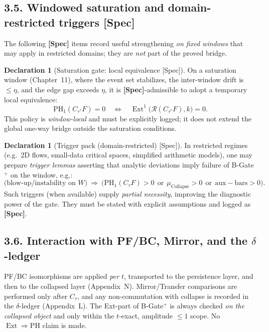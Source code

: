 \documentclass[11pt]{article}
\DeclareMathOperator{\Ext}{Ext}
\numberwithin{equation}{section}
\theoremstyle{definition}
\newtheorem{declaration}[theorem]{Declaration}
\begin{document}
\subsection*{3.5. Windowed saturation and domain-restricted triggers \textup{[Spec]}}
The following \textbf{[Spec]} items record useful strengthening \emph{on fixed windows} that may apply in restricted domains; they are \emph{not} part of the proved bridge.

\begin{declaration}[Saturation gate: local equivalence \textup{[Spec]}]\label{dec:saturation-local}
On a saturation window (Chapter~11), where the event set stabilizes, the inter-window drift is $\le\eta$, and the edge gap exceeds $\eta$, it is \textbf{[Spec]}-admissible to adopt a temporary local equivalence:
\[
\mathrm{PH}_1(C_{\tau^\ast}F)=0\quad\Longleftrightarrow\quad \Ext^1\!\big(\mathcal{R}(C_{\tau^\ast}F),k\big)=0.
\]
This policy is \emph{window-local} and must be explicitly logged; it does not extend the global one-way bridge outside the saturation conditions.
\end{declaration}

\begin{declaration}[Trigger pack (domain-restricted) \textup{[Spec]}]\label{dec:trigger-pack}
In restricted regimes (e.g.\ 2D flows, small-data critical spaces, simplified arithmetic models), one may prepare \emph{trigger lemmas} asserting that analytic deviations imply failure of B-Gate$^{+}$ on the window, e.g.:
\[
\text{(blow-up/instability on $W$)}\ \Rightarrow\ \bigl(\mathrm{PH}_1(C_\tau F)>0\ \ \text{or}\ \ \mu_{\mathrm{Collapse}}>0\ \ \text{or}\ \ \mathrm{aux\!-\!bars}>0\bigr).
\]
Such triggers (when available) supply \emph{partial necessity}, improving the diagnostic power of the gate. They must be stated with explicit assumptions and logged as \textbf{[Spec]}.
\end{declaration}

\subsection*{3.6. Interaction with PF/BC, Mirror, and the $\delta$-ledger}
PF/BC isomorphisms are applied \emph{per $t$}, transported to the persistence layer, and then to the collapsed layer (Appendix~N).
Mirror/Transfer comparisons are performed only after $C_\tau$, and any non-commutation with collapse is recorded in the $\delta$-ledger (Appendix~L).
The Ext-part of B-Gate$^{+}$ is always checked \emph{on the collapsed object} and only within the $t$-exact, amplitude $\le 1$ scope. No $\Ext\Rightarrow\mathrm{PH}$ claim is made.
\end{document}
